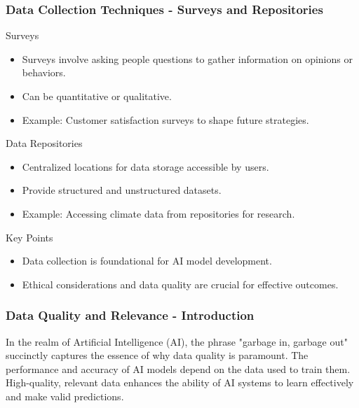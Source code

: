 \documentclass[aspectratio=169]{beamer}
\begin{document}
\begin{frame}[fragile]
    \frametitle{Data Collection Techniques - Surveys and Repositories}
    \begin{block}{Surveys}
        \begin{itemize}
            \item Surveys involve asking people questions to gather information on opinions or behaviors.
            \item Can be quantitative or qualitative.
            \item Example: Customer satisfaction surveys to shape future strategies.
        \end{itemize}
    \end{block}

    \begin{block}{Data Repositories}
        \begin{itemize}
            \item Centralized locations for data storage accessible by users.
            \item Provide structured and unstructured datasets.
            \item Example: Accessing climate data from repositories for research.
        \end{itemize}
    \end{block}
    
    \begin{block}{Key Points}
        \begin{itemize}
            \item Data collection is foundational for AI model development.
            \item Ethical considerations and data quality are crucial for effective outcomes.
        \end{itemize}
    \end{block}
\end{frame}

\begin{frame}[fragile]
  \frametitle{Data Quality and Relevance - Introduction}
  
  In the realm of Artificial Intelligence (AI), the phrase "garbage in, garbage out" succinctly captures the essence of why data quality is paramount. The performance and accuracy of AI models depend on the data used to train them. High-quality, relevant data enhances the ability of AI systems to learn effectively and make valid predictions.
  
\end{frame}
\end{document}
